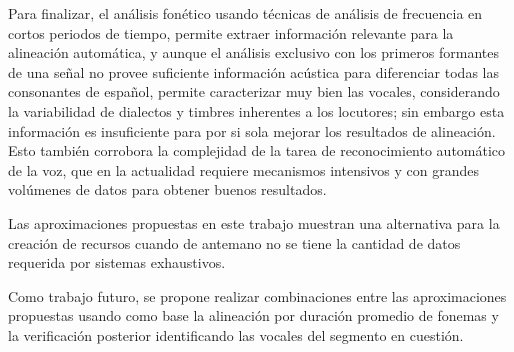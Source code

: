 Para finalizar, el análisis fonético usando técnicas de análisis de frecuencia en cortos periodos de tiempo, permite extraer información relevante para la alineación automática, y aunque el análisis exclusivo con los primeros formantes de una señal no provee suficiente información acústica para diferenciar todas las consonantes de español, permite caracterizar muy bien las vocales, considerando la variabilidad de dialectos y timbres inherentes a los locutores; sin embargo esta información es insuficiente para por si sola mejorar los resultados de alineación. Esto también corrobora la complejidad de la tarea de reconocimiento automático de la voz, que en la actualidad requiere mecanismos intensivos y con grandes volúmenes de datos para obtener buenos resultados.

Las aproximaciones propuestas en este trabajo muestran una alternativa para la creación de recursos cuando de antemano no se tiene la cantidad de datos requerida por sistemas exhaustivos.

Como trabajo futuro, se propone realizar combinaciones entre las aproximaciones propuestas usando como base la alineación por duración promedio de fonemas y la verificación posterior identificando las vocales del segmento en cuestión.
